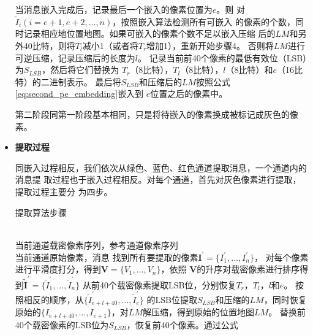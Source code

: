 \begin{itemize}
\begin{algorithm}[!h]
\begin{algorithmic}[1]
        \STATE 当消息嵌入完成后，记录最后一个嵌入的像素位置为$e$。则
        对$\tilde{I}_i (i=e+1, e+2,\dots, n)$，按照嵌入算法检测所有可嵌入
        的像素的个数，同时记录相应地位置地图。如果可嵌入的像素个数不足以嵌入压缩
        后的$LM$和另外40比特，则将$T_l$减小1（或者将$T_r$增加1），重新开始步骤4。
        否则将$LM$进行可逆压缩，记录压缩后的长度为$l$。
        \STATE 记录当前前40个像素的最低有效位（LSB）为$S_{LSB}$，然后将它们替换为
        $T_r$（8比特），$T_l$（8比特），$l$（8比特）和$e$（16比特）的二进制表示。
        最后将$S_{LSB}$和压缩后的$LM$按照公式\ref{eq:second_pe_embedding}嵌入到
        $e$位置之后的像素中。
      \end{algorithmic}
    \end{algorithm}
    \vspace{-6mm}
    \par
    第二阶段同第一阶段基本相同，只是将待嵌入的像素换成被标记成灰色的像素。
  \vspace{-3.5mm}
  \item \textbf{提取过程}
    \vspace{-2mm}
    \par
    同嵌入过程相反，我们依次从绿色、蓝色、红色通道提取消息，一个通道内的消息提
    取过程也于嵌入过程相反。对每个通道，首先对灰色像素进行提取，提取过程主要分
    为四步。
    \begin{algorithm}[!h]
      \renewcommand{\algorithmicrequire}{\textbf{输入：}}
      \renewcommand\algorithmicensure {\textbf{输出：}}
      \caption{提取算法步骤}
      \label{alg:embedding_step} 
      \begin{algorithmic}[1]
        \REQUIRE ~~\\ %
        当前通道载密像素序列，参考通道像素序列
        \ENSURE ~~\\ %
        当前通道原始像素，消息
        \vspace{2mm}
        \STATE 找到所有要提取的像素$\boldsymbol{I^{'}}=\{I_1^{'},\dots,I_n^{'}\}$，
        对每个像素进行平滑度打分，得到$\boldsymbol{V}=\{V_1,\dots,V_n\}$，依照
        $\boldsymbol{V}$的升序对载密像素进行排序得到$\boldsymbol{\tilde{I}^{'}}=
        \{\tilde{I}_1^{'},\dots,\tilde{I}_n^{'}\}$
        \STATE 从前40个载密像素提取LSB位，分别恢复$T_r$，$T_l$，$l$和$e$。
        \STATE 按照相反的顺序，从$\{\tilde{I}_{e+l+40}^{'},\dots,\tilde{I}_e^{'}\}$
        的LSB位提取$S_{LSB}$和压缩的$LM$，同时恢复原始的$\{I_{e+l+40},\dots,
        I_{e+1}\}$，对$LM$解压缩，得到原始的位置地图$LM$。
        \STATE 替换前40个载密像素的LSB位为$S_{LSB}$，恢复前40个像素。通过公式%

\end{algorithmic}
\end{algorithm}
\end{itemize}
